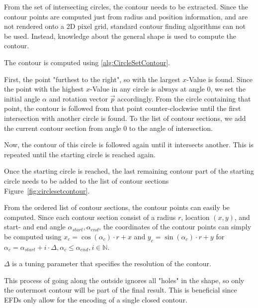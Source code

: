From the set of intersecting circles, the contour needs to be extracted. 
Since the contour points are computed just from radius and position information, and are not rendered onto a 2D pixel grid, standard contour finding algorithms can not be used.
Instead, knowledge about the general shape is used to compute the contour. 

The contour is computed using \autoref{alg:CircleSetContour}.

First, the point "furthest to the right", so with the largest $x$-Value is found. 
Since the point with the highest $x$-Value in any circle is always at angle 0, we set the initial angle $\alpha$ and rotation vector $\vec{p}$ accordingly.
From the circle containing that point, the contour is followed from that point counter-clockwise until the first intersection with another circle is found.
To the list of contour sections, we add the current contour section from angle $0$ to the angle of intersection.

Now, the contour of this circle is followed again until it intersects another. This is repeated until the starting circle is reached again.

Once the starting circle is reached, the last remaining contour part of the starting circle needs to be added to the list of contour sections Figure~\ref{fig:circlesetcontour}.

From the ordered list of contour sections, the contour points can easily be computed.
Since each contour section consist of a radius $r$, location $(x,y)$, and start- and end angle $\alpha_{start}, \alpha_{end}$, the coordinates of the contour points can simply be computed using $x_c = \cos(\alpha_c) \cdot r + x$ and  $y_c = \sin(\alpha_c) \cdot r + y$ 
for $\alpha_c = \alpha_{start} + i \cdot \Delta, \alpha_c \leq \alpha_{end}, i \in \mathbb{N}$.

$\Delta$ is a tuning parameter that specifies the resolution of the contour.

This process of going along the outside ignores all "holes" in the shape, so only the outermost contour will be part of the final result. 
This is beneficial since EFDs only allow for the encoding of a single closed contour.

